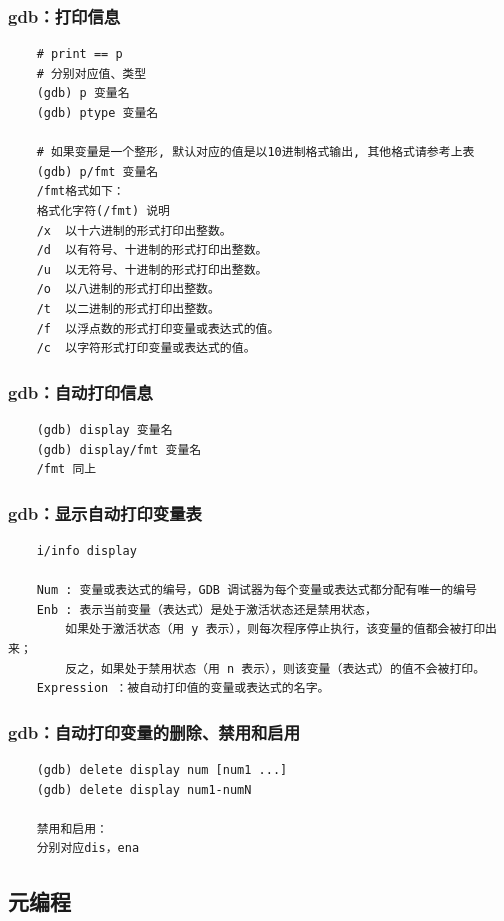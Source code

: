 \documentclass[UTF8]{ctexart}
\begin{document}
\subsubsection{gdb：打印信息}
\begin{verbatim}
	# print == p
	# 分别对应值、类型
	(gdb) p 变量名
	(gdb) ptype 变量名

	# 如果变量是一个整形, 默认对应的值是以10进制格式输出, 其他格式请参考上表
	(gdb) p/fmt 变量名
	/fmt格式如下：
	格式化字符(/fmt)	说明
	/x	以十六进制的形式打印出整数。
	/d	以有符号、十进制的形式打印出整数。
	/u	以无符号、十进制的形式打印出整数。
	/o	以八进制的形式打印出整数。
	/t	以二进制的形式打印出整数。
	/f	以浮点数的形式打印变量或表达式的值。
	/c	以字符形式打印变量或表达式的值。
\end{verbatim}

\subsubsection{gdb：自动打印信息}
\begin{verbatim}
	(gdb) display 变量名
	(gdb) display/fmt 变量名
	/fmt 同上
\end{verbatim}

\subsubsection{gdb：显示自动打印变量表}
\begin{verbatim}
	i/info display
	
	Num : 变量或表达式的编号，GDB 调试器为每个变量或表达式都分配有唯一的编号
	Enb : 表示当前变量（表达式）是处于激活状态还是禁用状态，
		如果处于激活状态（用 y 表示），则每次程序停止执行，该变量的值都会被打印出来；
		反之，如果处于禁用状态（用 n 表示），则该变量（表达式）的值不会被打印。
	Expression ：被自动打印值的变量或表达式的名字。
\end{verbatim}

\subsubsection{gdb：自动打印变量的删除、禁用和启用}
\begin{verbatim}
	(gdb) delete display num [num1 ...]
	(gdb) delete display num1-numN
	
	禁用和启用：
	分别对应dis，ena
\end{verbatim}



\subsection{元编程}
\end{document}
